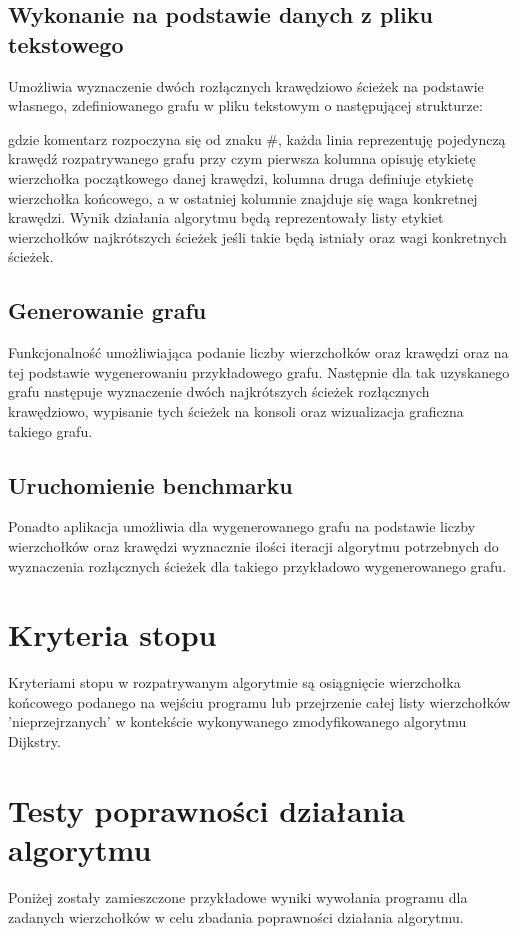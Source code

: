 \documentclass[10pt,a4paper]{article}
\begin{document}
\subsection{Wykonanie na podstawie danych z pliku tekstowego}
Umożliwia wyznaczenie dwóch rozłącznych krawędziowo ścieżek na podstawie własnego, zdefiniowanego grafu w pliku tekstowym o następującej strukturze:


gdzie komentarz rozpoczyna się od znaku \#, każda linia reprezentuję pojedynczą krawędź rozpatrywanego grafu przy czym pierwsza kolumna opisuję etykietę wierzchołka początkowego danej krawędzi, kolumna druga definiuje etykietę wierzchołka końcowego, a w ostatniej kolumnie znajduje się waga konkretnej krawędzi. Wynik działania algorytmu będą reprezentowały listy etykiet wierzchołków najkrótszych ścieżek jeśli takie będą istniały oraz wagi konkretnych ścieżek.

\subsection{Generowanie grafu}
Funkcjonalność umożliwiająca podanie liczby wierzchołków oraz krawędzi oraz na tej podstawie wygenerowaniu przykładowego grafu. Następnie dla tak uzyskanego grafu następuje wyznaczenie dwóch najkrótszych ścieżek rozłącznych krawędziowo, wypisanie tych ścieżek na konsoli oraz wizualizacja graficzna takiego grafu.
\subsection{Uruchomienie benchmarku}
Ponadto aplikacja umożliwia dla wygenerowanego grafu na podstawie liczby wierzchołków oraz krawędzi wyznacznie ilości iteracji algorytmu potrzebnych do wyznaczenia rozłącznych ścieżek dla takiego przykładowo wygenerowanego grafu.

\section{Kryteria stopu}
Kryteriami stopu w rozpatrywanym algorytmie są osiągnięcie wierzchołka końcowego podanego na wejściu programu lub przejrzenie całej listy wierzchołków 'nieprzejrzanych' w kontekście wykonywanego zmodyfikowanego algorytmu Dijkstry.

\section{Testy poprawności działania algorytmu}
Poniżej zostały zamieszczone przykładowe wyniki wywołania programu dla zadanych wierzchołków w celu zbadania poprawności działania algorytmu.
\end{document}
